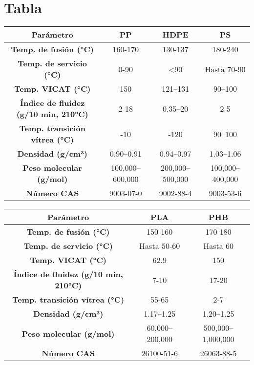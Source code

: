 \documentclass[a4paper]{tufte-handout} %
\begin{document}
\newpage

\section*{Tabla}

\begin{table}[ht!]
\begin{tabular}{|c|c|c|c|}
\hline
\textbf{Parámetro}                           & \textbf{PP}     & \textbf{HDPE}   & \textbf{PS}     \\ \hline
\textbf{Temp. de fusión (°C)}                & 160-170         & 130-137         & 180-240         \\ \hline
\textbf{Temp. de servicio (°C)}              & 0-90            & \textless{}90   & Hasta 70-90     \\ \hline
\textbf{Temp. VICAT (°C)}                    & 150             & 121–131         & 90–100          \\ \hline
\textbf{Índice de fluidez (g/10 min, 210°C)} & 2-18            & 0.35–20         & 2-5             \\ \hline
\textbf{Temp. transición vítrea (°C)}        & -10             & -120            & 90–100          \\ \hline
\textbf{Densidad (g/cm³)}                    & 0.90–0.91       & 0.94–0.97       & 1.03–1.06       \\ \hline
\textbf{Peso molecular (g/mol)}              & 100,000–600,000 & 200,000–500,000 & 100,000–400,000 \\ \hline
\textbf{Número CAS}                          & 9003-07-0       & 9002-88-4       & 9003-53-6       \\ \hline
\end{tabular}
\end{table}


\begin{table}[ht!]
\begin{tabular}{|c|c|c|}
\hline
\textbf{Parámetro}                           & \textbf{PLA}   & \textbf{PHB}      \\ \hline
\textbf{Temp. de fusión (°C)}                & 150-160        & 170-180           \\ \hline
\textbf{Temp. de servicio (°C)}              & Hasta 50-60    & Hasta 60          \\ \hline
\textbf{Temp. VICAT (°C)}                    & 62.9           & 150               \\ \hline
\textbf{Índice de fluidez (g/10 min, 210°C)} & 7-10           & 17-20             \\ \hline
\textbf{Temp. transición vítrea (°C)}        & 55-65          & 2-7               \\ \hline
\textbf{Densidad (g/cm³)}                    & 1.17–1.25      & 1.20–1.25         \\ \hline
\textbf{Peso molecular (g/mol)}              & 60,000–200,000 & 500,000–1,000,000 \\ \hline
\textbf{Número CAS}                          & 26100-51-6     & 26063-88-5        \\ \hline
\end{tabular}
\end{table}
\end{document}
